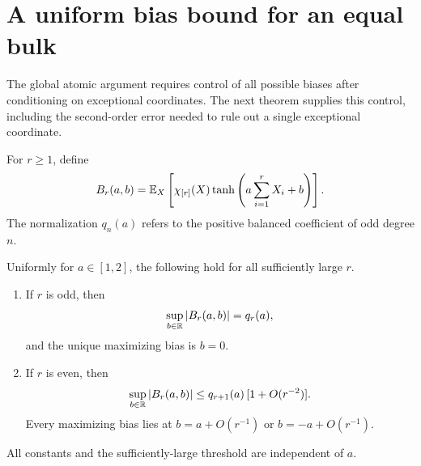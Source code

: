 \section{A uniform bias bound for an equal bulk}
\label{sec:equal-bulk-bias}

The global atomic argument requires control of all possible biases after
conditioning on exceptional coordinates. The next theorem supplies
this control, including the second-order error needed to rule out a
single exceptional coordinate.

For $r\ge1$, define
\[
 B_r(a,b)=\mathbb E_X\left[\chi_{[r]}(X)
           \tanh\left(a\sum_{i=1}^rX_i+b\right)\right].
\]
The normalization $q_n(a)$ refers to the positive balanced coefficient
of odd degree $n$.

\begin{theorem}
\label{thm:equal-bulk-bias}
Uniformly for $a\in[1,2]$, the following hold for all sufficiently
large $r$.
\begin{enumerate}
\item If $r$ is odd, then
\[
 \sup_{b\in\mathbb R}|B_r(a,b)|=q_r(a),
\]
and the unique maximizing bias is $b=0$.
\item If $r$ is even, then
\[
 \sup_{b\in\mathbb R}|B_r(a,b)|
 \le q_{r+1}(a)\,[1+O(r^{-2})].
\]
Every maximizing bias lies at $b=a+O(r^{-1})$ or
$b=-a+O(r^{-1})$.
\end{enumerate}
All constants and the sufficiently-large threshold are independent of
$a$.
\end{theorem}

